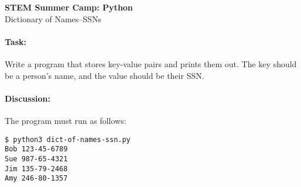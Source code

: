 \documentclass[11pt]{article}
\begin{document}
    \begin{center}

        \large\textbf{STEM Summer Camp: Python} \\
        Dictionary of Names--SSNs \\

    \end{center}

    \paragraph{Task:} Write a program that stores key-value pairs and
    prints them out. The key should be a person's name, and the value
    should be their SSN.  
    
    \paragraph{Discussion:} The program must run as follows:
    
    \vspace{1.5em}

\begin{verbatim}
$ python3 dict-of-names-ssn.py
Bob 123-45-6789
Sue 987-65-4321
Jim 135-79-2468
Amy 246-80-1357
\end{verbatim}
    
\end{document}
